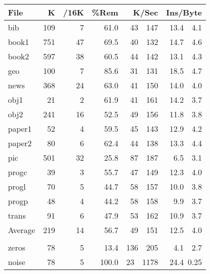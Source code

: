 \begin{figure}
\begin{center}
\begin{tabular}{|lrr|r|r|r|}
\hline
File   &      K &   /16K & \%Rem &    K/Sec      & Ins/Byte   \\ \hline
bib    &    109 &      7 &  61.0 &    43~~147     & 13.4~~4.1   \\
book1  &    751 &     47 &  69.5 &    40~~132     & 14.7~~4.6   \\
book2  &    597 &     38 &  60.5 &    44~~142     & 13.1~~4.3   \\
geo    &    100 &      7 &  85.6 &    31~~131     & 18.5~~4.7   \\
news   &    368 &     24 &  63.0 &    41~~150     & 14.0~~4.0   \\
obj1   &     21 &      2 &  61.9 &    41~~161     & 14.2~~3.7   \\
obj2   &    241 &     16 &  52.5 &    49~~156     & 11.8~~3.8   \\
paper1 &     52 &      4 &  59.5 &    45~~143     & 12.9~~4.2   \\
paper2 &     80 &      6 &  62.4 &    44~~138     & 13.3~~4.4   \\
pic    &    501 &     32 &  25.8 &    87~~187     &  6.5~~3.1   \\
progc  &     39 &      3 &  55.7 &    47~~149     & 12.3~~4.0   \\
progl  &     70 &      5 &  44.7 &    58~~157     & 10.0~~3.8   \\
progp  &     48 &      4 &  44.2 &    58~~158     &  9.9~~3.7   \\
trans  &     91 &      6 &  47.9 &    53~~162     & 10.9~~3.7   \\ \hline
Average&    219 &     14 &  56.7 &    49~~151     & 12.5~~4.0   \\ \hline
\multicolumn{6}{c}{\hbox{}}\\ \hline
zeros  &     78 &      5 &  13.4 &   136~~205     &  4.1~~2.7   \\
noise  &     78 &      5 & 100.0 &    23~~1178    & 24.4~0.25   \\  \hline
\end{tabular}
\end{center}
\end{figure}
